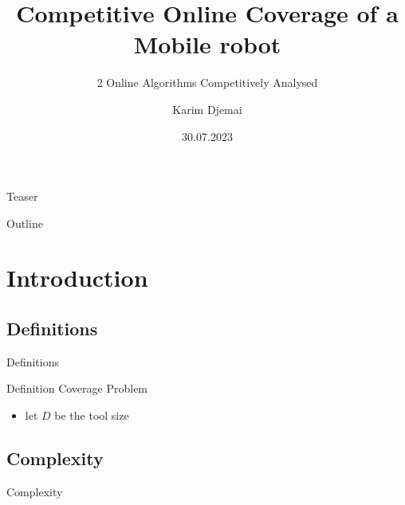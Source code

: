 \documentclass{beamer}
\title{Competitive Online Coverage of a Mobile robot}
\subtitle{2 Online Algorithms Competitively Analysed}
\author{Karim Djemai}
\institute{Universität Hamburg}
\date{30.07.2023}
\begin{document}

\begin{frame}
    \maketitle %
\end{frame}


\begin{frame}{Teaser}
\end{frame}

\begin{frame}{Outline}
    \tableofcontents[hideallsubsections]
\end{frame}

\section{Introduction}
\subsection{Definitions}
\begin{frame}{Definitions}
    \begin{block}{Definition Coverage Problem}
        \begin{itemize}
            \item let $D$ be the tool size
        \end{itemize}
    \end{block}
\end{frame}
\subsection{Complexity}
\begin{frame}{Complexity}
\end{frame}
\end{document}
